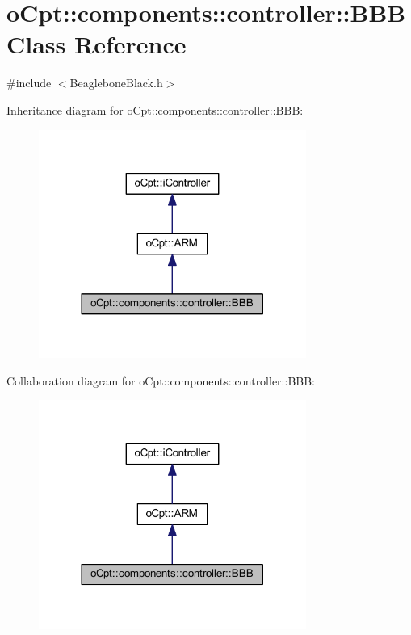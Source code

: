 \hypertarget{classo_cpt_1_1components_1_1controller_1_1_b_b_b}{}\section{o\+Cpt\+:\+:components\+:\+:controller\+:\+:B\+BB Class Reference}
\label{classo_cpt_1_1components_1_1controller_1_1_b_b_b}


{\ttfamily \#include $<$Beaglebone\+Black.\+h$>$}



Inheritance diagram for o\+Cpt\+:\+:components\+:\+:controller\+:\+:B\+BB\+:\nopagebreak
\begin{figure}[H]
\begin{center}
\leavevmode
\includegraphics[width=248pt]{classo_cpt_1_1components_1_1controller_1_1_b_b_b__inherit__graph}
\end{center}
\end{figure}


Collaboration diagram for o\+Cpt\+:\+:components\+:\+:controller\+:\+:B\+BB\+:\nopagebreak
\begin{figure}[H]
\begin{center}
\leavevmode
\includegraphics[width=248pt]{classo_cpt_1_1components_1_1controller_1_1_b_b_b__coll__graph}
\end{center}
\end{figure}
